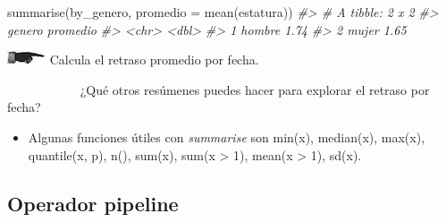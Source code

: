 \documentclass[
]{book}
\newenvironment{Shaded}{\begin{snugshade}}{\end{snugshade}}
\newcommand{\AttributeTok}[1]{\textcolor[rgb]{0.77,0.63,0.00}{#1}}
\newcommand{\CommentTok}[1]{\textcolor[rgb]{0.56,0.35,0.01}{\textit{#1}}}
\newcommand{\FunctionTok}[1]{\textcolor[rgb]{0.00,0.00,0.00}{#1}}
\newcommand{\NormalTok}[1]{#1}
\newcommand{\OtherTok}[1]{\textcolor[rgb]{0.56,0.35,0.01}{#1}}
\newcommand{\SpecialCharTok}[1]{\textcolor[rgb]{0.00,0.00,0.00}{#1}}
\providecommand{\tightlist}{%
  \setlength{\itemsep}{0pt}\setlength{\parskip}{0pt}}
\begin{document}
\begin{Shaded}
\begin{Highlighting}[]
\FunctionTok{summarise}\NormalTok{(by\_genero, }\AttributeTok{promedio =} \FunctionTok{mean}\NormalTok{(estatura))}
\CommentTok{\#\textgreater{} \# A tibble: 2 x 2}
\CommentTok{\#\textgreater{}   genero promedio}
\CommentTok{\#\textgreater{}   \textless{}chr\textgreater{}     \textless{}dbl\textgreater{}}
\CommentTok{\#\textgreater{} 1 hombre     1.74}
\CommentTok{\#\textgreater{} 2 mujer      1.65}
\end{Highlighting}
\end{Shaded}

\includegraphics{imagenes/manicule2.jpg} Calcula el retraso promedio por fecha.

~~~~~~~~~~~ ¿Qué otros
resúmenes puedes hacer para explorar el retraso por fecha?

\begin{itemize}
\tightlist
\item
  Algunas funciones útiles con \emph{summarise} son min(x), median(x), max(x),
  quantile(x, p), n(), sum(x), sum(x \textgreater{} 1), mean(x \textgreater{} 1), sd(x).
\end{itemize}

\begin{Shaded}
\end{Shaded}

\hypertarget{operador-pipeline}{%
\subsection*{Operador pipeline}\label{operador-pipeline}}
\end{document}
